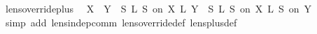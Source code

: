 \begin{isabellebody}
\endisatagproof
{\isafoldproof}%
%
\isadelimproof
\isanewline
%
\endisadelimproof
\isanewline
{}\isamarkupfalse%
\ lens{\isacharunderscore}override{\isacharunderscore}plus{\isacharcolon}\isanewline
\ \ {\isachardoublequoteopen}X\ {\isasymbowtie}\ Y\ {\isasymLongrightarrow}\ S\ {\isasymoplus}\isactrlsub L\ S\ on\ {\isacharparenleft}X\ {\isacharplus}\isactrlsub L\ Y{\isacharparenright}\ {\isacharequal}\ {\isacharparenleft}S\ {\isasymoplus}\isactrlsub L\ S\ on\ X{\isacharparenright}\ {\isasymoplus}\isactrlsub L\ S\ on\ Y{\isachardoublequoteclose}\isanewline
%
\isadelimproof
\ \ %
\endisadelimproof
%
\isatagproof
{}\isamarkupfalse%
\ {\isacharparenleft}simp\ add{\isacharcolon}\ lens{\isacharunderscore}indep{\isacharunderscore}comm\ lens{\isacharunderscore}override{\isacharunderscore}def\ lens{\isacharunderscore}plus{\isacharunderscore}def{\isacharparenright}%
\endisatagproof
{\isafoldproof}%
%
\isadelimproof
\isanewline
%
\endisadelimproof
%
\isadelimtheory
\ \ \isanewline
%
\endisadelimtheory
%
\isatagtheory
{}\isamarkupfalse%
%
\endisatagtheory
{\isafoldtheory}%
%
\isadelimtheory
%
\endisadelimtheory
%
\end{isabellebody}%
